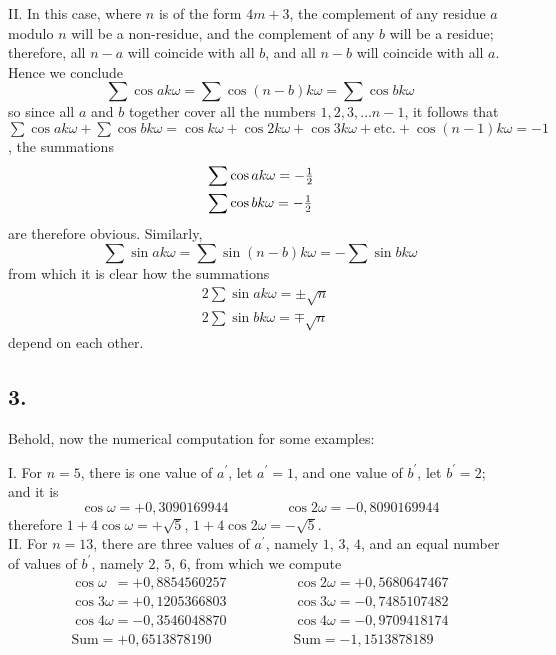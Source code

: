 \documentclass[twoside,12pt, showframe]{memoir}
\let\oldfrac\frac
\def\frac#1#2{\mathchoice{\tfrac{#1}{#2}}{\oldfrac{#1}{#2}}{\genfrac{}{}{}{2}{#1}{#2\mathstrut}}{\genfrac{}{}{}{3}{#1}{#2\mathstrut}}}
\begin{document}
II. In this case, where \(n\) is of the form \(4m+3\), the complement of any residue \(a\) modulo \(n\) will be a non-residue, and the complement of any \(b\) will be a residue; therefore, all \(n-a\) will coincide with all \(b\), and all \(n-b\) will coincide with all \(a\). Hence we conclude
\[\sum \cos a k \omega=\sum \cos (n-b) k \omega=\sum \cos b k \omega\]
so since all \(a\) and \(b\) together cover all the numbers \(1,2,3, \ldots n-1\), it follows that \(\sum \cos a k \omega+\sum \cos b k \omega=\cos k \omega+\cos 2 k \omega+\cos 3 k \omega+\text{etc.}+\cos (n-1) k \omega=-1\), the summations
\[\begin{aligned}
& \sum \cos a k \omega=-\frac{1}{2} \\
& \sum \cos b k \omega=-\frac{1}{2}
\end{aligned}\]
are therefore obvious. Similarly,
\[\sum \sin a k \omega=\sum \sin (n-b) k \omega=-\sum \sin b k \omega\]\clearpage\noindent%
from which it is clear how the summations
\[\begin{aligned}
& 2\sum \sin a k \omega= \pm \sqrt{n} \\
& 2\sum \sin b k \omega= \mp \sqrt{n}
\end{aligned}\]
depend on each other.
%

\subsection*{3.}

Behold, now the numerical computation for some examples:

I. For \(n=5\), there is one value of \(a^{\prime}\), let \(a^{\prime}=1\), and one value of \(b^{\prime}\), let \(b^{\prime}=2\); and it is
\[\cos \omega=+0{,}3090169944 \qquad \qquad \cos 2 \omega=-0{,}8090169944\]
therefore \(1+4 \cos \omega=+\surd 5\), \(1+4 \cos 2 \omega=-\surd 5\).\\
%

II. For \(n=13\), there are three values of \(a^{\prime}\), namely \(1\), \(3\), \(4\), and an equal number of values of \(b^{\prime}\), namely \(2\), \(5\), \(6\), from which we compute
\[ \begin{array}{r} 
\cos \omega\phantom{1} = + 0{,}8854560257 \\ 
\cos 3\omega = + 0{,}1205366803 \\ 
\cos 4 \omega = - 0{,}3546048870 \\ 
\hline \text{Sum} = + 0{,}6513878190 \end{array} 
\qquad \qquad
\begin{array}{r} 
\cos 2\omega = + 0{,}5680647467 \\ 
\cos 3\omega = - 0{,}7485107482 \\ 
\cos 4 \omega = - 0{,}9709418174 \\ 
\hline \text{Sum} = - 1{,}1513878189 \end{array} \]
 
\end{document}
